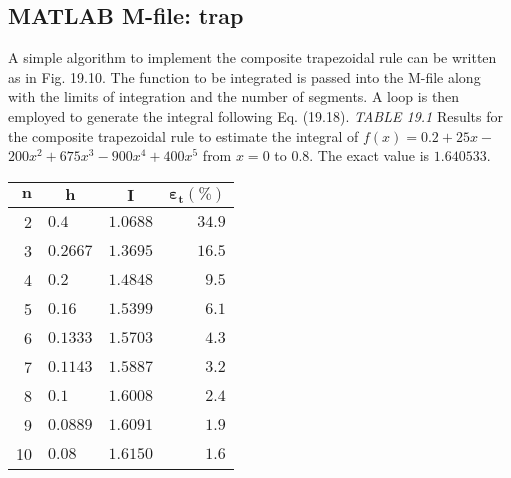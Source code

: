 \documentclass[../main.tex]{subfiles}
\begin{document}
\subsection{MATLAB M-file: trap}

A simple algorithm to implement the composite trapezoidal rule can be written as in
Fig. 19.10. The function to be integrated is passed into the M-file along with the limits of
integration and the number of segments. A loop is then employed to generate the integral
following Eq. (19.18).
\textit{TABLE 19.1} Results for the composite trapezoidal rule to estimate the integral of $f(x)=0.2+25 x-$ $200 x^{2}+675 x^{3}-900 x^{4}+400 x^{5}$ from $x=0$ to $0.8$. The exact value is $1.640533$.
\begin{center}
\begin{tabular}{rlrr}
\hline $\boldsymbol{n}$ & \multicolumn{1}{c}{$\boldsymbol{h}$} & \multicolumn{1}{c}{$\boldsymbol{I}$} & $\boldsymbol{\varepsilon}_{\boldsymbol{t}}(\%)$ \\
\hline 2 & $0.4$ & $1.0688$ & $34.9$ \\
3 & $0.2667$ & $1.3695$ & $16.5$ \\
4 & $0.2$ & $1.4848$ & $9.5$ \\
5 & $0.16$ & $1.5399$ & $6.1$ \\
6 & $0.1333$ & $1.5703$ & $4.3$ \\
7 & $0.1143$ & $1.5887$ & $3.2$ \\
8 & $0.1$ & $1.6008$ & $2.4$ \\
9 & $0.0889$ & $1.6091$ & $1.9$ \\
10 & $0.08$ & $1.6150$ & $1.6$ \\
\hline
\end{tabular}
\end{center}
\end{document}
